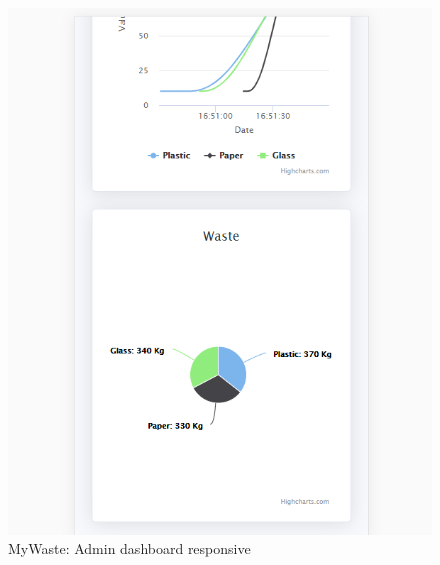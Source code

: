 \documentclass{report}
\begin{document}
\begin{figure}[h!]
    \begin{center}
        \includegraphics[width=1.0\textwidth]{images/adminDashboard_resp2.PNG}  \end{center}
    \caption{MyWaste: Admin dashboard responsive}
    \label{fig: respadmindash2}
\end{figure}
\end{document}
